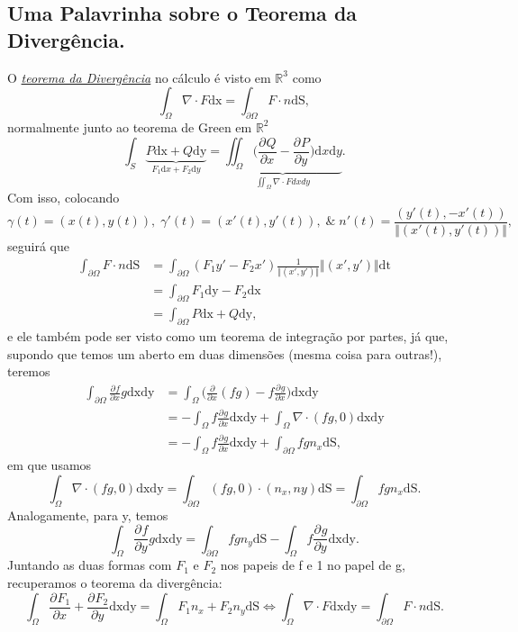 \documentclass[../pde_notes.tex]{subfiles}
\begin{document}
\subsection{Uma Palavrinha sobre o Teorema da Divergência.}
O \hyperlink{divergence_theorem}{\textit{teorema da Divergência}} no cálculo é visto em \(\mathbb{R}^{3}\) como
\[
	\int_{\Omega }^{}\nabla \cdot F \mathrm{dx} = \int_{\partial \Omega }^{}F \cdot n \mathrm{dS},
\]
normalmente junto ao teorema de Green em \(\mathbb{R}^{2}\)
\hypertarget{green_theorem}{\[
		\int_{S}^{}\underbrace{P \mathrm{dx} + Q \mathrm{dy}}_{F_1 \mathrm{d}x + F_2 \mathrm{d}y} = \underbrace{\iint_{\Omega }\biggl(\frac{\partial^{}Q}{\partial x^{}} - \frac{\partial^{}P}{\partial y^{}}\biggr) \mathrm{d}x \mathrm{d}y}_{\iint_{\Omega }\nabla \cdot F dxdy}.
	\]}
Com isso, colocando
\[
	\gamma (t) = (x(t), y(t)),\; \gamma '(t) = (x'(t), y'(t)),\;\&\; n'(t) = \frac{(y'(t),-x'(t))}{\Vert (x'(t), y'(t)) \Vert},
\]
seguirá que
\begin{align*}
	\int_{\partial \Omega }^{}F \cdot n \mathrm{dS} & = \int_{\partial \Omega }^{}(F_1 y' - F_2x')\frac{1}{\Vert (x', y') \Vert}\Vert (x', y') \Vert \mathrm{dt} \\
	                                                & =\int_{\partial \Omega }^{}F_1 \mathrm{dy} - F_2 \mathrm{dx}                                               \\
	                                                & = \int_{\partial \Omega }^{}P \mathrm{dx} + Q \mathrm{dy},
\end{align*}
e ele também pode ser visto como um teorema de integração por partes, já que, supondo que temos um aberto em duas dimensões (mesma coisa para outras!), teremos
\begin{align*}
	\int_{\partial \Omega }^{}\frac{\partial^{}f}{\partial x^{}}g \mathrm{dx}\mathrm{dy} & = \int_{\Omega }^{}\biggl(\frac{\partial^{}}{\partial x^{}}(fg) - f \frac{\partial^{}g}{\partial x^{}}\biggr) \mathrm{dxdy} \\
	                                                                                     & =-\int_{\Omega }^{}f \frac{\partial^{}g}{\partial x^{}} \mathrm{dxdy} + \int_{\Omega }^{}\nabla \cdot (fg, 0) \mathrm{dxdy} \\
	                                                                                     & = - \int_{\Omega }^{}f \frac{\partial^{}g}{\partial x^{}} \mathrm{dxdy} + \int_{\partial \Omega }^{}fg n_{x} \mathrm{dS},
\end{align*}
em que usamos
\[
	\int_{\Omega }^{}\nabla \cdot (fg, 0) \mathrm{dxdy} = \int_{\partial \Omega }^{}(fg, 0) \cdot (n_x, ny) \mathrm{dS} = \int_{\partial \Omega }^{}fgn_x \mathrm{dS}.
\]
Analogamente, para y, temos
\[
	\int_{\Omega }^{}\frac{\partial^{}f}{\partial y^{}}g \mathrm{dxdy} = \int_{\partial \Omega }^{}fgn_y \mathrm{dS} - \int_{\Omega }^{}f \frac{\partial^{}g}{\partial y^{}} \mathrm{dxdy}.
\]
Juntando as duas formas com \(F_1\) e \(F_2\) nos papeis de f e 1 no papel de g, recuperamos o teorema da divergência:
\[
	\int_{\Omega }^{}\frac{\partial^{}F_1}{\partial x^{}} + \frac{\partial^{}F_2}{\partial y^{}} \mathrm{dxdy} = \int_{\Omega }^{}F_1n_x + F_2n_y \mathrm{dS} \Longleftrightarrow \int_{\Omega }^{}\nabla \cdot F \mathrm{dxdy} = \int_{\partial \Omega }^{}F \cdot n \mathrm{dS}.
\]
\end{document}
